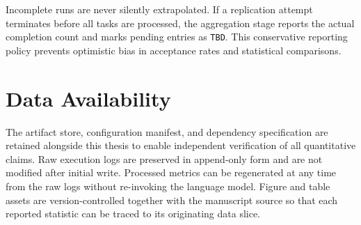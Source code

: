 Incomplete runs are never silently extrapolated.  If a replication attempt
terminates before all tasks are processed, the aggregation stage reports the
actual completion count and marks pending entries as \texttt{TBD}.  This
conservative reporting policy prevents optimistic bias in acceptance rates and
statistical comparisons.

\section{Data Availability}
\label{sec:repro:data}

The artifact store, configuration manifest, and dependency specification are
retained alongside this thesis to enable independent verification of all
quantitative claims.  Raw execution logs are preserved in append-only form and
are not modified after initial write.  Processed metrics can be regenerated at
any time from the raw logs without re-invoking the language model.  Figure and
table assets are version-controlled together with the manuscript source so that
each reported statistic can be traced to its originating data slice.
